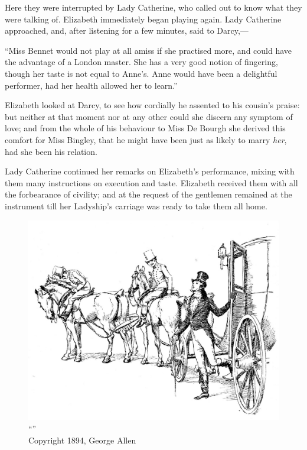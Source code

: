 Here they were interrupted by Lady Catherine, who called out to know what they were talking of. Elizabeth immediately began playing again. Lady Catherine approached, and, after listening for a few minutes, said to Darcy,---

``Miss Bennet would not play at all amiss if she practised more, and could have the advantage of a London master. She has a very good notion of fingering, though her taste is not equal to Anne's. Anne would have been a delightful performer, had her health allowed her to learn.''

Elizabeth looked at Darcy, to see how cordially he assented to his cousin's praise: but neither at that moment nor at any other could she discern any symptom of love; and from the whole of his behaviour to Miss De Bourgh she derived this comfort for Miss Bingley, that he might have been just as likely to marry \textit{her}, had she been his relation.

Lady Catherine continued her remarks on Elizabeth's performance, mixing with them many instructions on execution and taste. Elizabeth received them with all the forbearance of civility; and at the request of the gentlemen remained at the instrument till her Ladyship's carriage was ready to take them all home.

\begin{figure}[htbp]
    \centering
    \includegraphics[width=\textwidth]{illustrations/i_031.jpg}
    \caption{“”\\ Copyright 1894, George Allen}
    \label{fig:image}
\end{figure}


